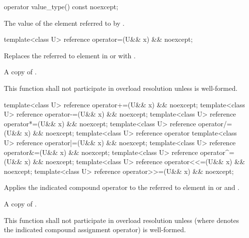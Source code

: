 \begin{itemdecl}
operator value_type() const noexcept;
\end{itemdecl}

\begin{itemdescr}
  \pnum\returns
  The value of the element referred to by .
\end{itemdescr}

\begin{itemdecl}
template<class U> reference operator=(U&& x) && noexcept;
\end{itemdecl}

\begin{itemdescr}
  \pnum\effects
  Replaces the referred to element in  or  with .

  \pnum\returns
  A copy of .

  \pnum\remarks
  This function shall not participate in overload resolution unless  is well-formed.
\end{itemdescr}

\begin{itemdecl}
template<class U> reference operator+=(U&& x) && noexcept;
template<class U> reference operator-=(U&& x) && noexcept;
template<class U> reference operator*=(U&& x) && noexcept;
template<class U> reference operator/=(U&& x) && noexcept;
template<class U> reference operator%
template<class U> reference operator|=(U&& x) && noexcept;
template<class U> reference operator&=(U&& x) && noexcept;
template<class U> reference operator^=(U&& x) && noexcept;
template<class U> reference operator<<=(U&& x) && noexcept;
template<class U> reference operator>>=(U&& x) && noexcept;
\end{itemdecl}

\begin{itemdescr}
  \pnum\effects
  Applies the indicated compound operator to the referred to element in  or  and .

  \pnum\returns
  A copy of .

  \pnum\remarks
  This function shall not participate in overload resolution unless  (where  denotes the indicated compound assignment operator) is well-formed.
\end{itemdescr}

